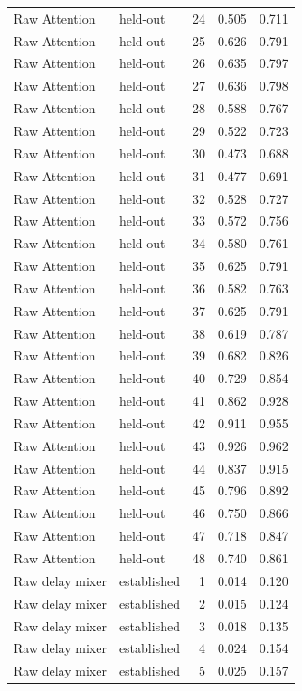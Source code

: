 \begin{tabular}{llrrr}
Raw Attention & held-out & 24 & 0.505 & 0.711 \\
Raw Attention & held-out & 25 & 0.626 & 0.791 \\
Raw Attention & held-out & 26 & 0.635 & 0.797 \\
Raw Attention & held-out & 27 & 0.636 & 0.798 \\
Raw Attention & held-out & 28 & 0.588 & 0.767 \\
Raw Attention & held-out & 29 & 0.522 & 0.723 \\
Raw Attention & held-out & 30 & 0.473 & 0.688 \\
Raw Attention & held-out & 31 & 0.477 & 0.691 \\
Raw Attention & held-out & 32 & 0.528 & 0.727 \\
Raw Attention & held-out & 33 & 0.572 & 0.756 \\
Raw Attention & held-out & 34 & 0.580 & 0.761 \\
Raw Attention & held-out & 35 & 0.625 & 0.791 \\
Raw Attention & held-out & 36 & 0.582 & 0.763 \\
Raw Attention & held-out & 37 & 0.625 & 0.791 \\
Raw Attention & held-out & 38 & 0.619 & 0.787 \\
Raw Attention & held-out & 39 & 0.682 & 0.826 \\
Raw Attention & held-out & 40 & 0.729 & 0.854 \\
Raw Attention & held-out & 41 & 0.862 & 0.928 \\
Raw Attention & held-out & 42 & 0.911 & 0.955 \\
Raw Attention & held-out & 43 & 0.926 & 0.962 \\
Raw Attention & held-out & 44 & 0.837 & 0.915 \\
Raw Attention & held-out & 45 & 0.796 & 0.892 \\
Raw Attention & held-out & 46 & 0.750 & 0.866 \\
Raw Attention & held-out & 47 & 0.718 & 0.847 \\
Raw Attention & held-out & 48 & 0.740 & 0.861 \\
Raw delay mixer & established & 1 & 0.014 & 0.120 \\
Raw delay mixer & established & 2 & 0.015 & 0.124 \\
Raw delay mixer & established & 3 & 0.018 & 0.135 \\
Raw delay mixer & established & 4 & 0.024 & 0.154 \\
Raw delay mixer & established & 5 & 0.025 & 0.157 \\

\end{tabular}
